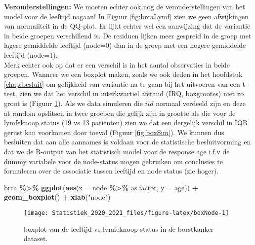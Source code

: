 \documentclass[
  12pt,dutch,coursenotes]{book}
\newenvironment{Shaded}{\begin{snugshade}}{\end{snugshade}}
\newcommand{\DataTypeTok}[1]{\textcolor[rgb]{0.13,0.29,0.53}{#1}}
\newcommand{\KeywordTok}[1]{\textcolor[rgb]{0.13,0.29,0.53}{\textbf{#1}}}
\newcommand{\NormalTok}[1]{#1}
\newcommand{\OperatorTok}[1]{\textcolor[rgb]{0.81,0.36,0.00}{\textbf{#1}}}
\newcommand{\StringTok}[1]{\textcolor[rgb]{0.31,0.60,0.02}{#1}}
\theoremstyle{definition}
\theoremstyle{definition}
\theoremstyle{definition}
\theoremstyle{remark}
\begin{document}
\textbf{Veronderstellingen:} We moeten echter ook nog de veronderstellingen van het model voor de leeftijd nagaan! In Figuur \ref{fig:brcaLymf} zien we geen afwijkingen van normaliteit in de QQ-plot.
Er lijkt echter wel een aanwijzing dat de variantie in beide groepen verschillend is. De residuen lijken meer gespreid in de groep met lagere gemiddelde leeftijd (node=0) dan in de groep met een hogere gemiddelde leeftijd (node=1).\\
Merk echter ook op dat er een verschil is in het aantal observaties in beide groepen.
Wanneer we een boxplot maken, zoals we ook deden in het hoofdstuk \ref{chap:besluit} om gelijkheid van variantie na te gaan bij het uitvoeren van een t-test, zien we dat het verschil in interkwartiel afstand (IRQ, boxgrootes) niet zo groot is (Figuur \ref{fig:boxNode}).
Als we data simuleren die \(iid\) normaal verdeeld zijn en deze at random opslitsen in twee groepen die gelijk zijn in grootte als die voor de lymfeknoop status (19 vs 13 patiënten) zien we dat een dergelijk verschil in IQR gerust kan voorkomen door toeval (Figuur \ref{fig:boxSim}).
We kunnen dus besluiten dat aan alle aannames is voldaan voor de statistische besluitvorming en dat we de R-output van het statistisch model voor de response age i.f.v de dummy variabele voor de node-status mogen gebruiken om conclusies te formuleren over de associatie tussen leeftijd en node status (zie hoger).

\begin{Shaded}
\begin{Highlighting}[]
\NormalTok{brca }\OperatorTok{\%\textgreater{}\%}\StringTok{ }\KeywordTok{ggplot}\NormalTok{(}\KeywordTok{aes}\NormalTok{(}\DataTypeTok{x =}\NormalTok{ node }\OperatorTok{\%\textgreater{}\%}\StringTok{ }\NormalTok{as.factor, }\DataTypeTok{y =}\NormalTok{ age)) }\OperatorTok{+}\StringTok{ }
\StringTok{    }\KeywordTok{geom\_boxplot}\NormalTok{() }\OperatorTok{+}\StringTok{ }\KeywordTok{xlab}\NormalTok{(}\StringTok{"node"}\NormalTok{)}
\end{Highlighting}
\end{Shaded}

\begin{figure}

{\centering \texttt{[image: Statistiek\_2020\_2021\_files/figure-latex/boxNode-1]} 

}

\caption{boxplot van de leeftijd vs lymfeknoop status in de borstkanker dataset.}\label{fig:boxNode}
\end{figure}
\end{document}

